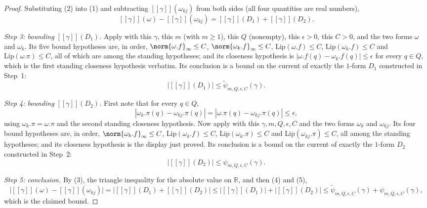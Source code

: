 \begin{proof}
  Substituting (2) into (1) and subtracting $[[\gamma]](\omega_{kj})$ from both sides (all four
  quantities are real numbers),
  \[
    [[\gamma]](\omega) - [[\gamma]](\omega_{kj}) = [[\gamma]](D_1) + [[\gamma]](D_2)
    . \tag{3}
  \]

  \emph{Step 3: bounding $[[\gamma]](D_1)$.} Apply  with this $\gamma$, this
  $m$ (with $m \ge 1$), this $Q$ (nonempty), this $\epsilon > 0$, this $C > 0$, and the two forms
  $\omega$ and $\omega_k$. Its five bound hypotheses are, in order,
  $\norm{\omega.f}_\infty \le C$, $\norm{\omega_k.f}_\infty \le C$, $\mathrm{Lip}(\omega.f) \le C$,
  $\mathrm{Lip}(\omega_k.f) \le C$ and $\mathrm{Lip}(\omega.\pi) \le C$, all of which are among the
  standing hypotheses; and its closeness hypothesis is
  $|\omega.f(q) - \omega_k.f(q)| \le \epsilon$ for every $q \in Q$, which is the first standing
  closeness hypothesis verbatim. Its conclusion is a bound on the current of exactly the $1$-form
  $D_1$ constructed in Step~1:
  \[
    \bigl| [[\gamma]](D_1) \bigr| \le \tilde\psi_{m,Q,\epsilon,C}(\gamma)
    . \tag{4}
  \]

  \emph{Step 4: bounding $[[\gamma]](D_2)$.} First note that for every $q \in Q$,
  \[
    |\omega_k.\pi(q) - \omega_{kj}.\pi(q)| = |\omega.\pi(q) - \omega_{kj}.\pi(q)| \le \epsilon
    ,
  \]
  using $\omega_k.\pi = \omega.\pi$ and the second standing closeness hypothesis. Now apply
   with this $\gamma, m, Q, \epsilon, C$ and the two forms $\omega_k$ and
  $\omega_{kj}$. Its four bound hypotheses are, in order, $\norm{\omega_k.f}_\infty \le C$,
  $\mathrm{Lip}(\omega_k.f) \le C$, $\mathrm{Lip}(\omega_k.\pi) \le C$ and
  $\mathrm{Lip}(\omega_{kj}.\pi) \le C$, all among the standing hypotheses; and its closeness
  hypothesis is the display just proved. Its conclusion is a bound on the current of exactly the
  $1$-form $D_2$ constructed in Step~2:
  \[
    \bigl| [[\gamma]](D_2) \bigr| \le \psi_{m,Q,\epsilon,C}(\gamma)
    . \tag{5}
  \]

  \emph{Step 5: conclusion.} By (3), the triangle inequality for the absolute value on
  $\mathbb{R}$, and then (4) and (5),
  \[
    \bigl| [[\gamma]](\omega) - [[\gamma]](\omega_{kj}) \bigr|
    = \bigl| [[\gamma]](D_1) + [[\gamma]](D_2) \bigr|
    \le \bigl| [[\gamma]](D_1) \bigr| + \bigl| [[\gamma]](D_2) \bigr|
    \le \tilde\psi_{m,Q,\epsilon,C}(\gamma) + \psi_{m,Q,\epsilon,C}(\gamma)
    ,
  \]
  which is the claimed bound.
\end{proof}
